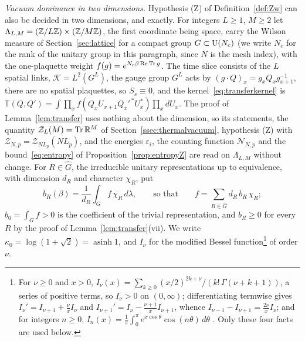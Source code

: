 \emph{Vacuum dominance in two dimensions.} Hypothesis (Z) of
Definition~\ref{def:Zw} can also be decided in two dimensions, and exactly.
For integers $L\ge1$, $M\ge2$ let $\Lambda_{L,M}=(\mathbb{Z}/L\mathbb{Z})\times(\mathbb{Z}/M\mathbb{Z})$, the
first coordinate being space, carry the Wilson measure of
Section~\ref{sec:lattice} for a compact group $G\subset\mathrm{U}(N_c)$ (we write
$N_c$ for the rank of the unitary group in this paragraph, since $N$ is the
mesh index), with the one-plaquette weight $f(g)=e^{N_c\beta\operatorname{Re}\operatorname{Tr} g}$. The time
slice consists of the $L$ spatial links, $\mathcal K=L^2(G^L)$, the gauge
group $G^L$ acts by $(g\cdot Q)_x=g_xQ_xg_{x+1}^{-1}$, there are no spatial
plaquettes, so $S_s\equiv0$, and the kernel~\eqref{eq:transferkernel} is
$\mathbb T(Q,Q')=\int\prod_xf(Q_xU_{x+1}Q_x'^{\,*}U_x^*)\prod_xdU_x$. The proof
of Lemma~\ref{lem:transfer} uses nothing about the dimension, so its
statements, the quantity $\mathcal Z_L(M)=\operatorname{Tr}\mathbb R^M$ of
Section~\ref{ssec:thermalvacuum}, hypothesis (Z) with $\mathcal Z_{N,p}=
\mathcal Z_{NL_p}(NL_p)$, and the energies $\varepsilon_i$, the counting
function $\mathcal N_{N,p}$ and the bound~\eqref{eq:entropy} of
Proposition~\ref{prop:entropyZ} are read on $\Lambda_{L,M}$ without change.
For $R\in\hat G$, the irreducible unitary representations up to equivalence,
with dimension $d_R$ and character $\chi_R$, put
\[
b_R(\beta)=\frac1{d_R}\int_Gf\,\overline{\chi_R}\,d\lambda,\qquad\text{so that}
\qquad f=\sum_{R\in\hat G}d_R\,b_R\,\chi_R ;
\]
$b_0=\int_Gf>0$ is the coefficient of the trivial representation, and
$b_R\ge0$ for every $R$ by the proof of Lemma~\ref{lem:transfer}(vii). We
write $\kappa_0=\log(1+\sqrt2)=\operatorname{asinh}1$, and $I_\nu$ for the
modified Bessel function\footnote{For $\nu\ge0$ and $x>0$,
$I_\nu(x)=\sum_{k\ge0}(x/2)^{2k+\nu}/(k!\,\Gamma(\nu+k+1))$, a series of
positive terms, so $I_\nu>0$ on $(0,\infty)$; differentiating termwise gives
$I_\nu'=I_{\nu+1}+\frac\nu xI_\nu$ and $I_{\nu+1}'=I_\nu-\frac{\nu+1}xI_{\nu+1}$,
whence $I_{\nu-1}-I_{\nu+1}=\frac{2\nu}xI_\nu$; and for integers $n\ge0$,
$I_n(x)=\frac1\pi\int_0^\pi e^{x\cos\theta}\cos(n\theta)\,d\theta$
\cite[\S\S3.7, 3.71]{Wat44}. Only these four facts are used below.}
of order $\nu$.

